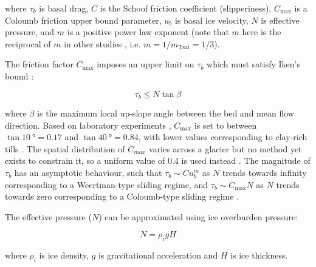 where $\tau_b$ is basal drag, $C$ is the Schoof friction coefficient (slipperiness), $C_{\text{max}}$ is a Coloumb friction upper bound parameter, $u_b$ is basal ice velocity, $N$ is effective pressure, and $m$ is a positive power law exponent (note that $m$ here is the reciprocal of $m$ in other studies \citep[e.g.][]{TsaiMarineicesheetprofiles2015}, i.e. $m = 1/m_{\text{Tsai}} = 1/3$).

The friction factor $C_{\text{max}}$ imposes an upper limit on $\tau_b$ which must satisfy Iken's bound \citep{IkenEffectSubglacialWater1981,GagliardiniFiniteelementmodelingsubglacial2007}:

\begin{equation}
  \tau_b \leq N\tan\beta
\end{equation}

where $\beta$ is the maximum local up-slope angle between the bed and mean flow direction.
Based on laboratory experiments \citep{IversonRingshearstudiestill1998}, $C_{\text{max}}$ is set to between $\tan \SI{10}{\degree} = 0.17$ and $\tan \SI{40}{\degree} = 0.84$, with lower values corresponding to clay-rich tills \citep[, pp.266-267]{Cuffeyphysicsglaciers2010}.
The spatial distribution of $C_{max}$ varies across a glacier but no method yet exists to constrain it, so a uniform value of 0.4 is used instead \citep[0.4 and 0.6 was used in][]{BrondexSensitivitycentennialmass2019}.
The magnitude of $\tau_b$ has an asymptotic behaviour, such that $\tau_b \sim C u_b^m$ as $N$ trends towards infinity corresponding to a Weertman-type sliding regime, and $\tau_b \sim C_{\text{max}} N$ as $N$ trends towards zero corresponding to a Coloumb-type sliding regime \citep{BrondexSensitivitygroundingline2017}.

The effective pressure ($N$) can be approximated using ice overburden pressure:

\begin{equation}
  N = \rho_i g H
\end{equation}

where $\rho_i$ is ice density, $g$ is gravitational acceleration and $H$ is ice thickness.



